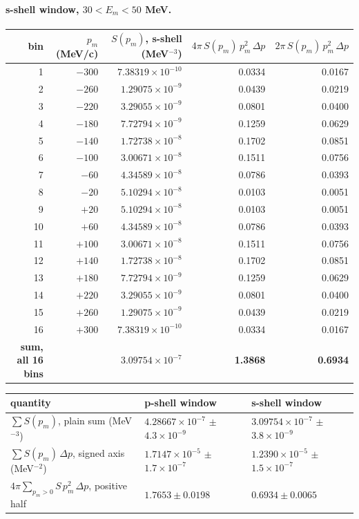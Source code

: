 \documentclass[11pt]{article}
\begin{document}
\paragraph{s-shell window, $30 < E_m < 50$ MeV.}
\begin{center}\small\renewcommand{\arraystretch}{0.95}
\begin{tabular}{rrrrr}
\toprule
bin & $p_m$ (MeV/c) & $S(p_m)$, s-shell (MeV$^{-3}$) & $4\pi\,S(p_m)\,p_m^2\,\Delta p$ & $2\pi\,S(p_m)\,p_m^2\,\Delta p$ \\
\midrule
1 & $-300$ & $7.38319\times10^{-10}$ & 0.0334 & 0.0167 \\
2 & $-260$ & $1.29075\times10^{-9}$ & 0.0439 & 0.0219 \\
3 & $-220$ & $3.29055\times10^{-9}$ & 0.0801 & 0.0400 \\
4 & $-180$ & $7.72794\times10^{-9}$ & 0.1259 & 0.0629 \\
5 & $-140$ & $1.72738\times10^{-8}$ & 0.1702 & 0.0851 \\
6 & $-100$ & $3.00671\times10^{-8}$ & 0.1511 & 0.0756 \\
7 & $-60$ & $4.34589\times10^{-8}$ & 0.0786 & 0.0393 \\
8 & $-20$ & $5.10294\times10^{-8}$ & 0.0103 & 0.0051 \\
9 & $+20$ & $5.10294\times10^{-8}$ & 0.0103 & 0.0051 \\
10 & $+60$ & $4.34589\times10^{-8}$ & 0.0786 & 0.0393 \\
11 & $+100$ & $3.00671\times10^{-8}$ & 0.1511 & 0.0756 \\
12 & $+140$ & $1.72738\times10^{-8}$ & 0.1702 & 0.0851 \\
13 & $+180$ & $7.72794\times10^{-9}$ & 0.1259 & 0.0629 \\
14 & $+220$ & $3.29055\times10^{-9}$ & 0.0801 & 0.0400 \\
15 & $+260$ & $1.29075\times10^{-9}$ & 0.0439 & 0.0219 \\
16 & $+300$ & $7.38319\times10^{-10}$ & 0.0334 & 0.0167 \\
\midrule
\textbf{sum, all 16 bins} & & \textbf{$3.09754\times10^{-7}$} & \textbf{1.3868} & \textbf{0.6934} \\
\bottomrule
\end{tabular}
\end{center}

\begin{center}\small
\begin{tabular}{lll}
\toprule
quantity & p-shell window & s-shell window \\
\midrule
$\sum S(p_m)$, plain sum (MeV$^{-3}$) & $4.28667\times10^{-7}$ $\pm$ $4.3\times10^{-9}$ & $3.09754\times10^{-7}$ $\pm$ $3.8\times10^{-9}$ \\
$\sum S(p_m)\,\Delta p$, signed axis (MeV$^{-2}$) & $1.7147\times10^{-5}$ $\pm$ $1.7\times10^{-7}$ & $1.2390\times10^{-5}$ $\pm$ $1.5\times10^{-7}$ \\
$4\pi\sum_{p_m>0} S\,p_m^2\,\Delta p$, positive half & $\mathbf{1.7653 \pm 0.0198}$ & $\mathbf{0.6934 \pm 0.0065}$ \\
\bottomrule
\end{tabular}
\end{center}
\end{document}
